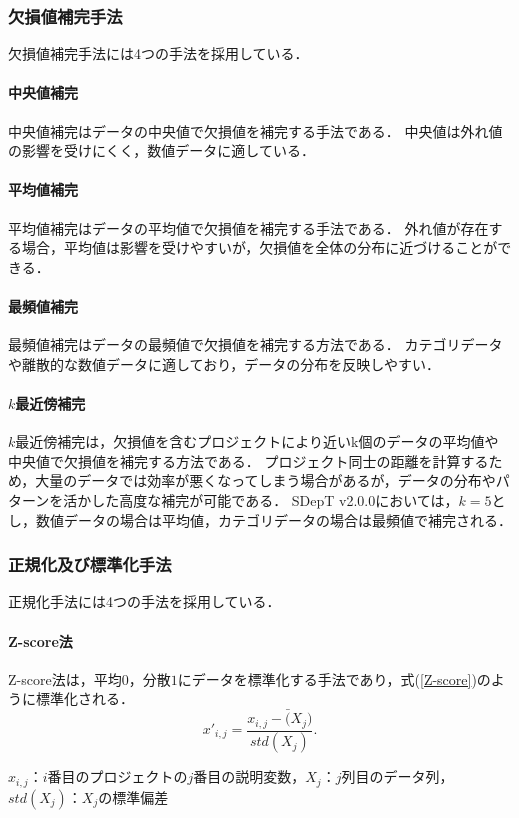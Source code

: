 \subsubsection{欠損値補完手法}\label{Imputation}
欠損値補完手法には4つの手法を採用している．
\paragraph{中央値補完 \quad \\}
中央値補完はデータの中央値で欠損値を補完する手法である．
中央値は外れ値の影響を受けにくく，数値データに適している．
\paragraph{平均値補完 \quad \\}
平均値補完はデータの平均値で欠損値を補完する手法である．
外れ値が存在する場合，平均値は影響を受けやすいが，欠損値を全体の分布に近づけることができる．
\paragraph{最頻値補完 \quad \\}
最頻値補完はデータの最頻値で欠損値を補完する方法である．
カテゴリデータや離散的な数値データに適しており，データの分布を反映しやすい．
\paragraph{$k$最近傍補完 \quad \\}
$k$最近傍補完は，欠損値を含むプロジェクトにより近いk個のデータの平均値や中央値で欠損値を補完する方法である．
プロジェクト同士の距離を計算するため，大量のデータでは効率が悪くなってしまう場合があるが，データの分布やパターンを活かした高度な補完が可能である．
SDepT v2.0.0においては，$k=5$とし，数値データの場合は平均値，カテゴリデータの場合は最頻値で補完される．

\subsubsection{正規化及び標準化手法}\label{Normalization}
正規化手法には4つの手法を採用している．
\paragraph{Z-score法 \quad \\}
Z-score法\cite{Huang2017}は，平均$0$，分散$1$にデータを標準化する手法であり，式(\ref{Z-score})のように標準化される．
\begin{equation}
  \label{Z-score}
  x'_{i,j} = \frac{x_{i,j} - \bar(X_j)}{std(X_j)}.
\end{equation}
\begin{center}
  $x_{i,j}$：$i$番目のプロジェクトの$j$番目の説明変数，$X_j$：$j$列目のデータ列，$std(X_j)$：$X_j$の標準偏差
\end{center}


